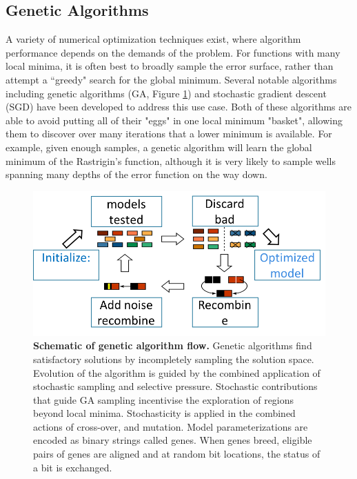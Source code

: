\subsection{Genetic Algorithms}
A variety of numerical optimization techniques exist, where algorithm performance depends on the demands of the problem.
For functions with many local minima, it is often best to broadly sample the error surface, rather than attempt a ``greedy" search for the global minimum.
Several notable algorithms including genetic algorithms (GA, Figure \ref{fig:GeneticAlgOver}) and stochastic gradient descent (SGD) have been developed to address this use case.
Both of these algorithms are able to avoid putting all of their "eggs" in one local minimum "basket", allowing them to discover over many iterations that a lower minimum is available.
For example, given enough samples, a genetic algorithm will learn the global minimum of the Rastrigin's function, although it is very likely to sample wells spanning many depths of the error function on the way down.

\begin{figure}
\begin{center}

    \includegraphics[width=0.7\linewidth]{figures/How_Genetic_Alg_Works.png}
  \caption{\textbf{Schematic of genetic algorithm flow.} Genetic algorithms find satisfactory solutions by incompletely sampling the solution space. Evolution of the algorithm is guided by the combined application of stochastic sampling and selective pressure. Stochastic contributions that guide GA sampling incentivise the exploration of regions beyond local minima. Stochasticity is applied in the combined actions of cross-over, and mutation. Model parameterizations are encoded as binary strings called genes. When genes breed, eligible pairs of genes are aligned and at random bit locations, the status of a bit is exchanged.  
}
  \label{fig:GeneticAlgOver}
\end{center}

\end{figure}
  
